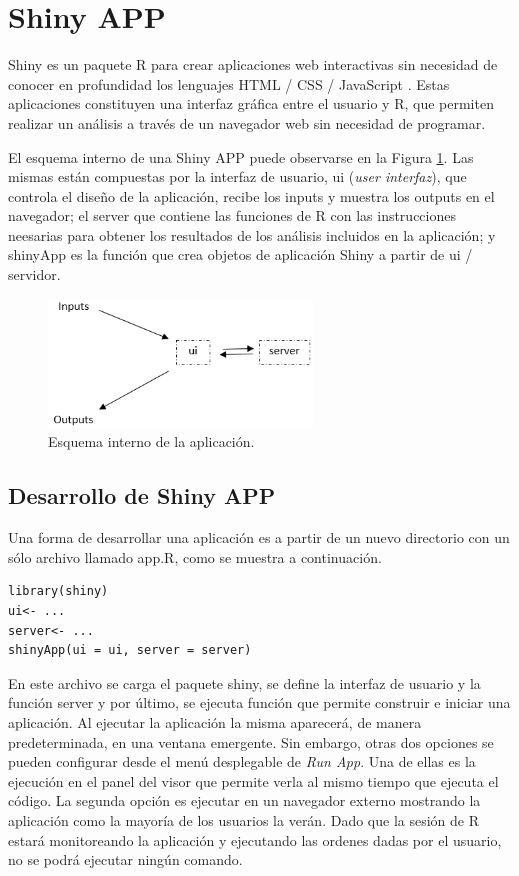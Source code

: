 \section{Shiny APP}
Shiny es un paquete R para crear aplicaciones web interactivas sin necesidad de conocer en profundidad los lenguajes HTML / CSS / JavaScript . Estas aplicaciones constituyen una interfaz gráfica entre el usuario y R, que permiten realizar un análisis a través de un navegador web sin necesidad de programar.

El esquema interno de una Shiny APP puede observarse en la Figura \ref{fig:fig321}. Las mismas están compuestas por la interfaz de usuario, ui (\emph{user interfaz}), que controla el diseño de la aplicación, recibe los inputs y muestra los outputs en el navegador; el server que contiene las funciones de R con las instrucciones neesarias para obtener los resultados de los análisis incluidos en la aplicación; y shinyApp es la función que crea objetos de aplicación Shiny a partir de ui / servidor. 

\begin{figure}[H]
\begin{center}
\includegraphics[width=7cm]{./Graficos/figura7}
\end{center}
\caption{Esquema interno de la aplicación.}
\label{fig:fig321}
\end{figure}


\subsection{Desarrollo de Shiny APP}

Una forma de desarrollar una  aplicación es a partir de un nuevo directorio con un sólo archivo llamado app.R, como se muestra a continuación. 

\begin{lstlisting}
library(shiny)
ui<- ...
server<- ...
shinyApp(ui = ui, server = server)
\end{lstlisting}

En este archivo se carga el paquete shiny, se define la interfaz de usuario y la función server y por último, se ejecuta función que permite construir e iniciar una aplicación. Al ejecutar la aplicación la misma aparecerá, de manera predeterminada, en una ventana emergente. Sin embargo, otras dos opciones se pueden configurar desde el menú desplegable de \emph{Run App}. Una de ellas es la ejecución en el panel del visor que permite verla al mismo tiempo que ejecuta el código. La segunda opción es ejecutar en un navegador externo mostrando la aplicación como la mayoría de los usuarios la verán. Dado que la sesión de R estará monitoreando la aplicación y ejecutando las ordenes dadas por el usuario, no se podrá ejecutar ningún comando.


